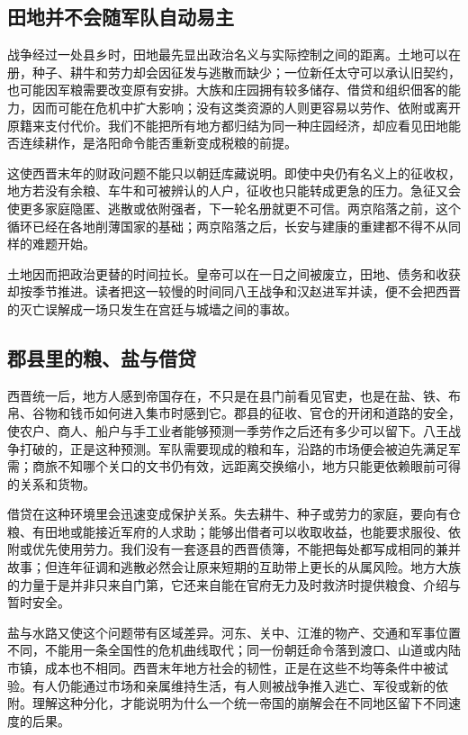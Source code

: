 \subsection{田地并不会随军队自动易主}

战争经过一处县乡时，田地最先显出政治名义与实际控制之间的距离。土地可以在册，种子、耕牛和劳力却会因征发与逃散而缺少；一位新任太守可以承认旧契约，也可能因军粮需要改变原有安排。大族和庄园拥有较多储存、借贷和组织佃客的能力，因而可能在危机中扩大影响；没有这类资源的人则更容易以劳作、依附或离开原籍来支付代价。我们不能把所有地方都归结为同一种庄园经济，却应看见田地能否连续耕作，是洛阳命令能否重新变成税粮的前提。

这使西晋末年的财政问题不能只以朝廷库藏说明。即使中央仍有名义上的征收权，地方若没有余粮、车牛和可被辨认的人户，征收也只能转成更急的压力。急征又会使更多家庭隐匿、逃散或依附强者，下一轮名册就更不可信。两京陷落之前，这个循环已经在各地削薄国家的基础；两京陷落之后，长安与建康的重建都不得不从同样的难题开始。

土地因而把政治更替的时间拉长。皇帝可以在一日之间被废立，田地、债务和收获却按季节推进。读者把这一较慢的时间同八王战争和汉赵进军并读，便不会把西晋的灭亡误解成一场只发生在宫廷与城墙之间的事故。

\subsection{郡县里的粮、盐与借贷}

西晋统一后，地方人感到帝国存在，不只是在县门前看见官吏，也是在盐、铁、布帛、谷物和钱币如何进入集市时感到它。郡县的征收、官仓的开闭和道路的安全，使农户、商人、船户与手工业者能够预测一季劳作之后还有多少可以留下。八王战争打破的，正是这种预测。军队需要现成的粮和车，沿路的市场便会被迫先满足军需；商旅不知哪个关口的文书仍有效，远距离交换缩小，地方只能更依赖眼前可得的关系和货物。

借贷在这种环境里会迅速变成保护关系。失去耕牛、种子或劳力的家庭，要向有仓粮、有田地或能接近军府的人求助；能够出借者可以收取收益，也能要求服役、依附或优先使用劳力。我们没有一套逐县的西晋债簿，不能把每处都写成相同的兼并故事；但连年征调和逃散必然会让原来短期的互助带上更长的从属风险。地方大族的力量于是并非只来自门第，它还来自能在官府无力及时救济时提供粮食、介绍与暂时安全。

盐与水路又使这个问题带有区域差异。河东、关中、江淮的物产、交通和军事位置不同，不能用一条全国性的危机曲线取代；同一份朝廷命令落到渡口、山道或内陆市镇，成本也不相同。西晋末年地方社会的韧性，正是在这些不均等条件中被试验。有人仍能通过市场和亲属维持生活，有人则被战争推入逃亡、军役或新的依附。理解这种分化，才能说明为什么一个统一帝国的崩解会在不同地区留下不同速度的后果。


